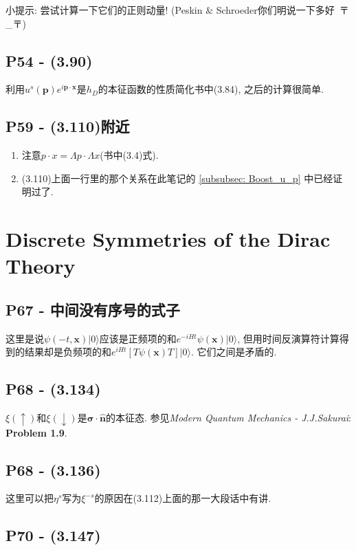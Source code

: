 小提示: 尝试计算一下它们的正则动量! (Peskin \& Schroeder你们明说一下多好\ 〒\_〒)

\subsection{P54 - (3.90)}

利用$u^s(\mathbf{p})e^{i\mathbf{p} \cdot \mathbf{x}}$是$h_D$的本征函数的性质简化书中(3.84), 之后的计算很简单.

\subsection{P59 - (3.110)附近}
\begin{enumerate}
  \item \textbf{}注意$p\cdot x = \Lambda p\cdot \Lambda x$(书中(3.4)式).
  \item \textbf{}(3.110)上面一行里的那个关系在此笔记的 \ref{subsubsec: Boost_u_p} 中已经证明过了.
\end{enumerate}

\section{Discrete Symmetries of the Dirac Theory}

\subsection{P67 - 中间没有序号的式子}

这里是说$\psi(-t, \mathbf{x})|0\rangle$应该是正频项的和$e^{-iHt}\psi(\mathbf{x})|0\rangle$, 但用时间反演算符计算得到的结果却是负频项的和$e^{iHt}[T\psi(\mathbf{x})T]|0\rangle$.
它们之间是矛盾的.

\subsection{P68 - (3.134)}

$\xi(\uparrow)$和$\xi(\downarrow)$是$\bm{\sigma}\cdot\mathbf{\hat{n}}$的本征态.
参见\textit{Modern Quantum Mechanics - J.J.Sakurai}: \textbf{Problem 1.9}.

\subsection{P68 - (3.136)}

这里可以把$\eta^s$写为$\xi^{-s}$的原因在(3.112)上面的那一大段话中有讲.

\subsection{P70 - (3.147)}

